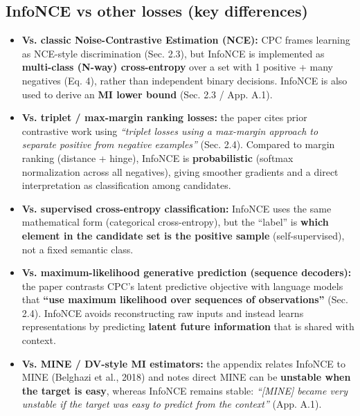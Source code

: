 \documentclass{article}
\begin{document}
\subsection*{InfoNCE vs other losses (key differences)}
\begin{itemize}
  \item \textbf{Vs. classic Noise-Contrastive Estimation (NCE):} CPC frames learning as NCE-style discrimination (Sec. 2.3), but InfoNCE is implemented as \textbf{multi-class (N-way) cross-entropy} over a set with 1 positive + many negatives (Eq. 4), rather than independent binary decisions. InfoNCE is also used to derive an \textbf{MI lower bound} (Sec. 2.3 / App. A.1).

  \item \textbf{Vs. triplet / max-margin ranking losses:} the paper cites prior contrastive work using \emph{``triplet losses using a max-margin approach to separate positive from negative examples''} (Sec. 2.4). Compared to margin ranking (distance + hinge), InfoNCE is \textbf{probabilistic} (softmax normalization across all negatives), giving smoother gradients and a direct interpretation as classification among candidates.

  \item \textbf{Vs. supervised cross-entropy classification:} InfoNCE uses the same mathematical form (categorical cross-entropy), but the “label” is \textbf{which element in the candidate set is the positive sample} (self-supervised), not a fixed semantic class.

  \item \textbf{Vs. maximum-likelihood generative prediction (sequence decoders):} the paper contrasts CPC’s latent predictive objective with language models that \textbf{``use maximum likelihood over sequences of observations''} (Sec. 2.4). InfoNCE avoids reconstructing raw inputs and instead learns representations by predicting \textbf{latent future information} that is shared with context.

  \item \textbf{Vs. MINE / DV-style MI estimators:} the appendix relates InfoNCE to MINE (Belghazi et al., 2018) and notes direct MINE can be \textbf{unstable when the target is easy}, whereas InfoNCE remains stable: \emph{``[MINE] became very unstable if the target was easy to predict from the context''} (App. A.1).
\end{itemize}
\end{document}
